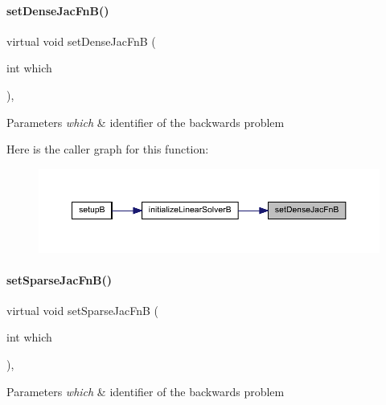 \paragraph{\texorpdfstring{setDenseJacFnB()}{setDenseJacFnB()}}
{\footnotesize\ttfamily virtual void set\+Dense\+Jac\+FnB (\begin{DoxyParamCaption}\item[{int}]{which }\end{DoxyParamCaption})\hspace{0.3cm}{\ttfamily [protected]}, {}}


\begin{DoxyParams}{Parameters}
{\em which} & identifier of the backwards problem \\
\hline
\end{DoxyParams}
Here is the caller graph for this function\+:
\nopagebreak
\begin{figure}[H]
\begin{center}
\leavevmode
\includegraphics[width=350pt]{classamici_1_1_solver_a1081b1ac835a2bf9221552a07d04ef4d_icgraph}
\end{center}
\end{figure}
\mbox{\label{classamici_1_1_solver_a101c62151da172cc06a025a3060b50de}} 
\paragraph{\texorpdfstring{setSparseJacFnB()}{setSparseJacFnB()}}
{\footnotesize\ttfamily virtual void set\+Sparse\+Jac\+FnB (\begin{DoxyParamCaption}\item[{int}]{which }\end{DoxyParamCaption})\hspace{0.3cm}{\ttfamily [protected]}, {}}


\begin{DoxyParams}{Parameters}
{\em which} & identifier of the backwards problem \\
\hline
\end{DoxyParams}
\mbox{\label{classamici_1_1_solver_a1040308561e87b1e2d24c3ab9581e14d}} 
